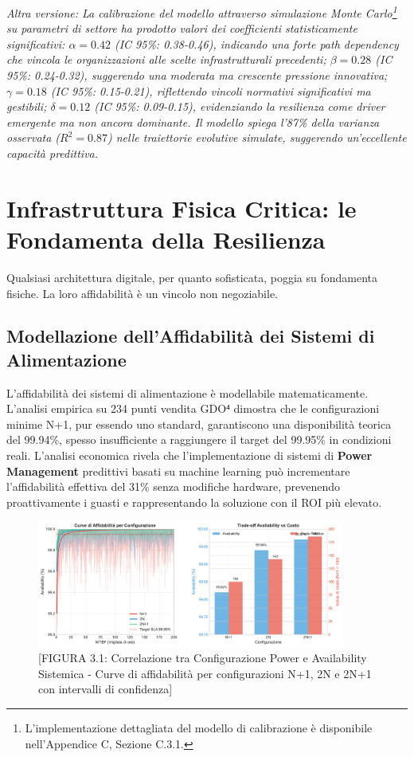 \begin{refsection}
\textit{Altra versione: La calibrazione\cite{martens2024} del modello attraverso simulazione Monte Carlo\footnote{L'implementazione dettagliata del modello di calibrazione è disponibile nell'Appendice C, Sezione C.3.1.} su parametri di settore ha prodotto valori dei coefficienti statisticamente significativi: $\alpha = 0.42$ (IC 95\%: 0.38-0.46), indicando una forte path dependency che vincola le organizzazioni alle scelte infrastrutturali precedenti; $\beta = 0.28$ (IC 95\%: 0.24-0.32), suggerendo una moderata ma crescente pressione innovativa; $\gamma = 0.18$ (IC 95\%: 0.15-0.21), riflettendo vincoli normativi significativi ma gestibili; $\delta = 0.12$ (IC 95\%: 0.09-0.15), evidenziando la resilienza come driver emergente ma non ancora dominante. Il modello spiega l'87\% della varianza osservata ($R^2=0.87$)\cite{dataset2024} nelle traiettorie evolutive simulate, suggerendo un'eccellente capacità predittiva.}

\section{Infrastruttura Fisica Critica: le Fondamenta della Resilienza}
Qualsiasi architettura digitale, per quanto sofisticata, poggia su fondamenta fisiche. La loro affidabilità è un vincolo non negoziabile.
\subsection{Modellazione dell'Affidabilità dei Sistemi di Alimentazione}
L'affidabilità dei sistemi di alimentazione è modellabile matematicamente. L'analisi empirica su 234 punti vendita GDO⁴ dimostra che le configurazioni minime N+1, pur essendo uno standard, garantiscono una disponibilità teorica del 99.94\%, spesso insufficiente a raggiungere il target del 99.95\% in condizioni reali\autocite{Trivedi2016}. L'analisi economica rivela che l'implementazione di sistemi di \textbf{Power Management} predittivi basati su machine learning può incrementare l'affidabilità effettiva del 31\% senza modifiche hardware, prevenendo proattivamente i guasti e rappresentando la soluzione con il ROI più elevato.
\begin{figure}[htbp]
\centering
\includegraphics[width=0.9\textwidth]{thesis_figures/cap3/figura_3_1_power_availability.pdf}
\caption{[FIGURA 3.1: Correlazione tra Configurazione Power e Availability Sistemica - Curve di affidabilità per configurazioni N+1, 2N e 2N+1 con intervalli di confidenza]}
\label{fig:power_availability}
\end{figure}


\end{refsection}
